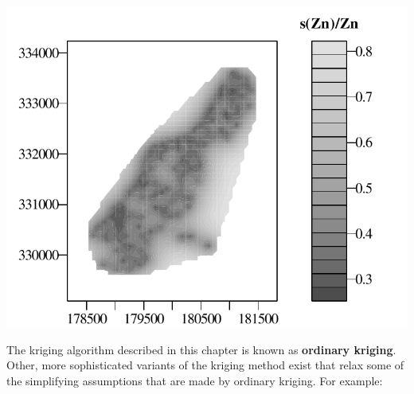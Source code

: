 \noindent\begin{minipage}[t][][b]{.6\textwidth}
\includegraphics[width=\textwidth]{../figures/meusecontourerr.pdf}\\
\end{minipage}
\begin{minipage}[t][][t]{.39\textwidth}
  \label{fig:meusecontourerr}
\end{minipage}

The kriging algorithm described in this chapter is known as
\textbf{ordinary kriging}.  Other, more sophisticated variants of the
kriging method exist that relax some of the simplifying assumptions
that are made by ordinary kriging.  For example:

